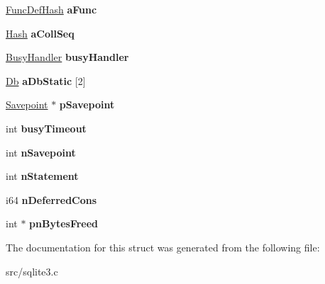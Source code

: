 \begin{DoxyCompactItemize}
\item 
\hypertarget{structsqlite3_a1f1c623a26e916021fbb2fe6d84dcede}{\hyperlink{struct_func_def_hash}{Func\-Def\-Hash} {\bfseries a\-Func}}\label{structsqlite3_a1f1c623a26e916021fbb2fe6d84dcede}

\item 
\hypertarget{structsqlite3_a259afda236b21b947f6dc7e0b3e605c3}{\hyperlink{struct_hash}{Hash} {\bfseries a\-Coll\-Seq}}\label{structsqlite3_a259afda236b21b947f6dc7e0b3e605c3}

\item 
\hypertarget{structsqlite3_a5f50915803efe2ad40dc1a5e31763671}{\hyperlink{struct_busy_handler}{Busy\-Handler} {\bfseries busy\-Handler}}\label{structsqlite3_a5f50915803efe2ad40dc1a5e31763671}

\item 
\hypertarget{structsqlite3_ad99069213dff7fede71447b97d22d710}{\hyperlink{struct_db}{Db} {\bfseries a\-Db\-Static} \mbox{[}2\mbox{]}}\label{structsqlite3_ad99069213dff7fede71447b97d22d710}

\item 
\hypertarget{structsqlite3_a47f4fe21bba981ccd47ee7f873f48a07}{\hyperlink{struct_savepoint}{Savepoint} $\ast$ {\bfseries p\-Savepoint}}\label{structsqlite3_a47f4fe21bba981ccd47ee7f873f48a07}

\item 
\hypertarget{structsqlite3_a69237f7a2b079706c544f09255fd8905}{int {\bfseries busy\-Timeout}}\label{structsqlite3_a69237f7a2b079706c544f09255fd8905}

\item 
\hypertarget{structsqlite3_a51d1dc4f5668dbc2282162bdfdca96ec}{int {\bfseries n\-Savepoint}}\label{structsqlite3_a51d1dc4f5668dbc2282162bdfdca96ec}

\item 
\hypertarget{structsqlite3_a727c6da42aa4313c715de350303c90f6}{int {\bfseries n\-Statement}}\label{structsqlite3_a727c6da42aa4313c715de350303c90f6}

\item 
\hypertarget{structsqlite3_a1d74627daa6fe93811e99cffe9362c10}{i64 {\bfseries n\-Deferred\-Cons}}\label{structsqlite3_a1d74627daa6fe93811e99cffe9362c10}

\item 
\hypertarget{structsqlite3_a5559fb199b06ee59b635bb18f153fcf8}{int $\ast$ {\bfseries pn\-Bytes\-Freed}}\label{structsqlite3_a5559fb199b06ee59b635bb18f153fcf8}

\end{DoxyCompactItemize}


The documentation for this struct was generated from the following file\-:\begin{DoxyCompactItemize}
\item 
src/sqlite3.\-c\end{DoxyCompactItemize}
